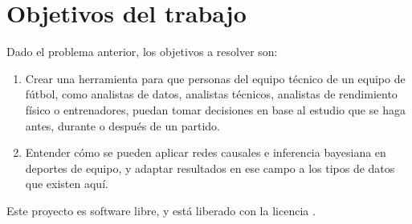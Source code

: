 \section{Objetivos del trabajo} \label{sect:goals}

Dado el problema anterior, los objetivos a resolver son:

\begin{enumerate}
    \item \label{obj:1} Crear una herramienta para que personas del equipo técnico de un equipo de fútbol, como analistas de datos, analistas técnicos, analistas de rendimiento 
    físico o entrenadores, puedan tomar decisiones en base al estudio que se haga antes, durante 
    o después de un partido. 
    \item \label{obj:2} Entender cómo se pueden aplicar redes causales e inferencia 
    bayesiana en deportes de equipo, y adaptar resultados en ese campo a 
    los tipos de datos que existen aquí.
\end{enumerate}

Este proyecto es software libre, y está liberado con la licencia \cite{gplv3}.
